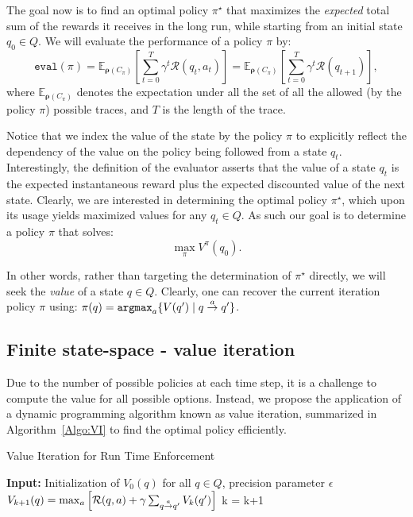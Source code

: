 The goal now is to find an optimal policy $\pi^{\star}$ that maximizes the \emph{expected} total sum of the rewards it receives in the long run, while starting from an initial state $q_{0} \in Q$. We will evaluate the performance of a policy $\pi$ by:
\begin{equation}
\label{Eq:ValueOne}
\texttt{eval}({\pi}) = \mathbb{E}_{\bm{\rho}(C_\pi)} \left[\sum_{t=0}^{T} \gamma^{t}\mathcal{R}(q_{t},a_{t})\right]= \mathbb{E}_{\bm{\rho}(C_\pi)} \left[\sum_{t=0}^{T} \gamma^{t}\mathcal{R}(q_{t+1})\right],
\end{equation}
where  $\mathbb{E}_{\bm{\rho}(C_\pi)}$ denotes the expectation under all the set of all the allowed (by the policy $\pi$) possible traces, and $T$ is the length of the trace. 


Notice that we index the value of the state by the policy $\pi$ to explicitly reflect the dependency of the value on the policy being followed from a state $q_{t}$. Interestingly, the definition of the evaluator asserts that the value of a state $q_{t}$ is the expected instantaneous reward plus the expected discounted value of the next state. Clearly, we are interested in determining the optimal policy $\pi^{\star}$, which upon its usage yields maximized values for any $q_{t} \in Q$. As such our goal is to determine a policy $\pi$ that solves:
\begin{equation*}
\max_{\pi} V^{\pi}(q_{0}). 
\end{equation*}

In other words, rather than targeting the determination of $\pi^{\star}$ directly, we will seek the \emph{value} of a state $q \in Q$. Clearly, one can recover the current iteration policy $\pi$ using:
$
\pi(q) = \texttt{argmax}_{a}\{V(q') \mid q \goesto[a] q'\}
$.


\subsection{Finite state-space - value iteration}
Due to the number of possible policies at each time step, it is a challenge to compute the value for all possible options. Instead, we propose the application of a dynamic programming algorithm known as value iteration, summarized in Algorithm~\ref{Algo:VI} to find the optimal policy efficiently. 
\begin{algorithm}[h!]
\caption{Value Iteration for Run Time Enforcement}
\label{Algo:VI}
\begin{algorithmic}[1]
\STATE \textbf{Input:} Initialization of $V_{0}(q)$ for all $q\in Q$, precision parameter $\epsilon$
			\STATE $V_{k+1}(q) = \max_{a} \left[\mathcal{R}(q, a) + \gamma \sum_{q \goesto[a]q^{\prime}}V_{k}(q^{\prime})\right]$
		\ENDFOR
	\ENDFOR
		\STATE k = k+1
\ENDWHILE
\end{algorithmic}
\end{algorithm}

